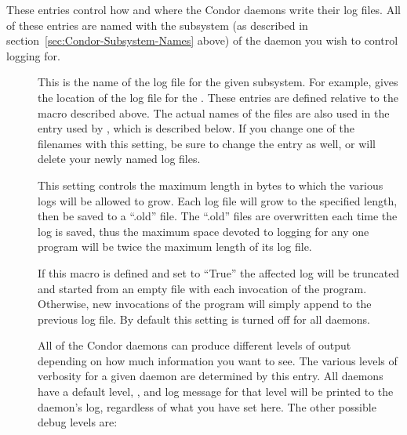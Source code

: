 These entries control how and where the Condor daemons write their log
files.  All of these entries are named with the subsystem (as
described in section~\ref{sec:Condor-Subsystem-Names} above) of the daemon
you wish to control logging for.

\begin{description}
 
\item[] \label{param:SubsysLog} This is the name of
  the log file for the given subsystem.  For example,
   gives the location of the log file for the
  .  These entries are defined relative to the
   macro described above.  The actual names of the files
  are also used in the  entry used by
  , which is described below.  If you change one of the
  filenames with this setting, be sure to change the
   entry as well, or  will
  delete your newly named log files.  
  
\item[] \label{param:MaxSubsysLog} This
  setting controls the maximum length in bytes to which the various
  logs will be allowed to grow.  Each log file will grow to the
  specified length, then be saved to a ``.old'' file.  The ``.old''
  files are overwritten each time the log is saved, thus the maximum
  space devoted to logging for any one program will be twice the
  maximum length of its log file.

\item[]
  \label{param:TruncSubsysLogOnOpen}  If this macro is defined and set
  to ``True'' the affected log will be truncated and started from an
  empty file with each invocation of the program.  Otherwise, new
  invocations of the program will simply append to the previous log
  file.  By default this setting is turned off for all daemons. 

\item[] \label{param:SubsysDebug} All of the
  Condor daemons can produce different levels of output depending on
  how much information you want to see.  The various levels of
  verbosity for a given daemon are determined by this entry.  All
  daemons have a default level, , and log message for
  that level will be printed to the daemon's log, regardless of what
  you have set here.  The other possible debug levels are:

\begin{description}
  

\end{description}
\end{description}
